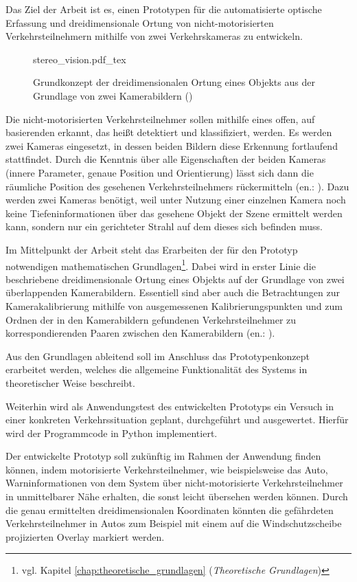 Das Ziel der Arbeit ist es, einen Prototypen für die automatisierte optische Erfassung und dreidimensionale Ortung von nicht-motorisierten Verkehrsteilnehmern mithilfe von zwei Verkehrskameras zu entwickeln.\mittelgrosserabstand

\begin{figure}[H]
	\centering
	\def\svgwidth{\columnwidth}
	{stereo_vision.pdf_tex}
	\caption{Grundkonzept der dreidimensionalen Ortung eines Objekts aus der Grundlage von zwei Kamerabildern ()}
	\label{fig:stereo_vision}
\end{figure}\kleinerabstand

Die nicht-motorisierten Verkehrsteilnehmer sollen mithilfe eines offen, auf  basierenden  erkannt, das heißt detektiert und klassifiziert, werden. Es werden zwei Kameras eingesetzt, in dessen beiden Bildern diese Erkennung fortlaufend stattfindet. Durch die Kenntnis über alle Eigenschaften der beiden Kameras (innere Parameter, genaue Position und Orientierung) lässt sich dann die räumliche Position des gesehenen Verkehrsteilnehmers rückermitteln (en.: ). Dazu werden zwei Kameras benötigt, weil unter Nutzung einer einzelnen Kamera noch keine Tiefeninformationen über das gesehene Objekt der Szene ermittelt werden kann, sondern nur ein gerichteter Strahl auf dem dieses sich befinden muss.\kleinerabstand

Im Mittelpunkt der Arbeit steht das Erarbeiten der für den Prototyp notwendigen mathematischen Grundlagen\footnote{vgl. Kapitel \ref{chap:theoretische_grundlagen} (\emph{Theoretische Grundlagen})}. Dabei wird in erster Linie die beschriebene dreidimensionale Ortung eines Objekts auf der Grundlage von zwei überlappenden Kamerabildern. Essentiell sind aber auch die Betrachtungen zur Kamerakalibrierung mithilfe von ausgemessenen Kalibrierungspunkten und zum Ordnen der in den Kamerabildern gefundenen Verkehrsteilnehmer zu korrespondierenden Paaren zwischen den Kamerabildern (en.: ).\kleinerabstand

\noindent Aus den Grundlagen ableitend soll im Anschluss das Prototypenkonzept erarbeitet werden, welches die allgemeine Funktionalität des Systems in theoretischer Weise beschreibt.\kleinerabstand

\noindent Weiterhin wird als Anwendungstest des entwickelten Prototyps ein Versuch in einer konkreten Verkehrssituation geplant, durchgeführt und ausgewertet. Hierfür wird der Programmcode in Python implementiert.\kleinerabstand

Der entwickelte Prototyp soll zukünftig im Rahmen der  Anwendung finden können, indem motorisierte Verkehrsteilnehmer, wie beispielsweise das Auto, Warninformationen von dem System über nicht-motorisierte Verkehrsteilnehmer in unmittelbarer Nähe erhalten, die sonst leicht übersehen werden können. Durch die genau ermittelten dreidimensionalen Koordinaten könnten die gefährdeten Verkehrsteilnehmer in Autos zum Beispiel mit einem auf die Windschutzscheibe projizierten Overlay markiert werden.
